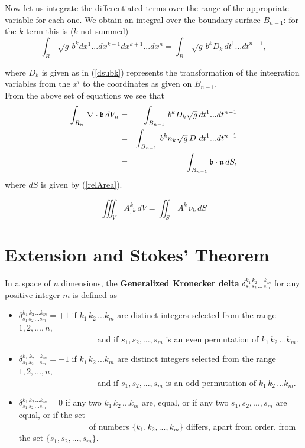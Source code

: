 Now let us integrate the differentiated terms over the range of the appropriate variable for each one. We obtain an integral over the boundary surface $B_{n-1}$: for the $k$ term this is ($k$ not summed)
\begin{equation}
\int_B \, \sqrt{g}\, b^k dx^1...dx^{k-1}dx^{k+1}...dx^n = \int_B \, \sqrt{g} \, b^k D_k\, dt^1...dt^{n-1},
\end{equation}

where $D_k$ is given as in (\ref{dsubk}) represents the transformation of the integration variables from the $x^i$ to the coordinates as given on $B_{n-1}$.\\

From the above set of equations we see that 
\begin{eqnarray*}
\int_{R_n}\, \nabla \cdot \mathfrak{b} \, dV_n &=& \int_{B_{n-1}} \, b^k D_k \sqrt{g}\, dt^1...dt^{n-1}\\
&=& \int_{B_{n-1}}\, b^k n_k \sqrt{g}\, D\ dt^1...dt^{n-1}\\
&=& \int_{B_{n-1}} \mathfrak{b} \cdot \mathfrak{n} \, dS,
\end{eqnarray*}
where $dS$ is given by (\ref{relArea}).

\begin{theorem}
\[\iiint_V \, A^k_{,k} \, dV = \iint_S \, A^k\, \nu_k \, dS \]
\end{theorem}

\section{Extension and Stokes' Theorem}

In a space of $n$ dimensions, the {\bf Generalized Kronecker delta} $\delta^{k_1\,k_2\,...\,k_m}_{s_1\,s_2\,...\,s_m}$ for any positive integer $m$ is defined as 
\begin{itemize}
\item[]$\delta^{k_1\,k_2\,...k_m}_{s_1\,s_2\,...s_m} = +1$ if $k_1\,k_2\,...k_m$ are distinct integers selected from the range $1, 2, ..., n$, \\
\null~~~~~~~~~~~~~~~~~~~and if $s_1, s_2, ...,s_m$ is an {\elevenit even} permutation of  $k_1\,k_2\,...k_m$.
\item[]$\delta^{k_1\,k_2\,...k_m}_{s_1\,s_2\,...s_m} = -1$ if $k_1\,k_2\,...k_m$ are distinct integers selected from the range $1, 2, ..., n$, \\
\null~~~~~~~~~~~~~~~~~~~and if $s_1, s_2, ...,s_m$ is an {\elevenit odd} permutation of  $k_1\,k_2\,...k_m$.
\item[]$\delta^{k_1\,k_2\,...k_m}_{s_1\,s_2\,...s_m} = 0$ if any two $k_1\,k_2\,...k_m$ are, equal, or if any two $s_1, s_2, ...,s_m$ are equal, or if the set \\
\null~~~~~~~~~~~~~~~~~of numbers $\{k_1, k_2, ..., k_m\}$ differs, apart from order, from the set $\{s_1, s_2, ..., s_m\}$.
\end{itemize} 

